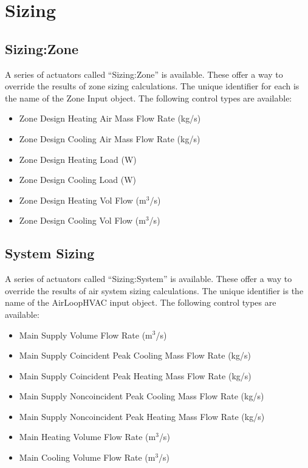 \section{Sizing}\label{sizing}

\subsection{Sizing:Zone}\label{sizingzone}

A series of actuators called ``Sizing:Zone'' is available. These offer a way to override the results of zone sizing calculations. The unique identifier for each is the name of the Zone Input object. The following control types are available:

\begin{itemize}
\item
  Zone Design Heating Air Mass Flow Rate (kg/s)
\item
  Zone Design Cooling Air Mass Flow Rate (kg/s)
\item
  Zone Design Heating Load (W)
\item
  Zone Design Cooling Load (W)
\item
  Zone Design Heating Vol Flow (m\(^{3}\)/s)
\item
  Zone Design Cooling Vol Flow (m\(^{3}\)/s)
\end{itemize}

\subsection{System Sizing}\label{system-sizing}

A series of actuators called ``Sizing:System'' is available. These offer a way to override the results of air system sizing calculations. The unique identifier is the name of the AirLoopHVAC input object. The following control types are available:

\begin{itemize}
\item
  Main Supply Volume Flow Rate (m\(^{3}\)/s)
\item
  Main Supply Coincident Peak Cooling Mass Flow Rate (kg/s)
\item
  Main Supply Coincident Peak Heating Mass Flow Rate (kg/s)
\item
  Main Supply Noncoincident Peak Cooling Mass Flow Rate (kg/s)
\item
  Main Supply Noncoincident Peak Heating Mass Flow Rate (kg/s)
\item
  Main Heating Volume Flow Rate (m\(^{3}\)/s)
\item
  Main Cooling Volume Flow Rate (m\(^{3}\)/s)
\end{itemize}
